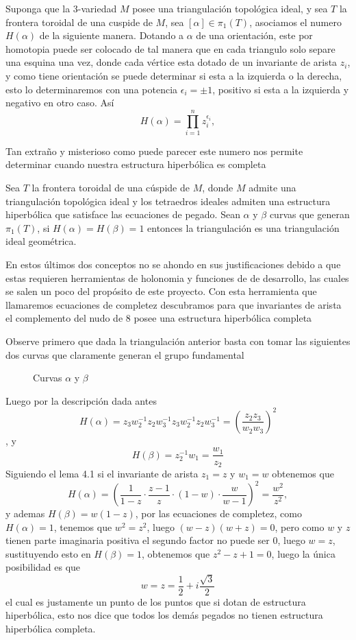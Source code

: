 \begin{definition}
    Suponga que la 3-variedad $M$ posee una triangulación topológica ideal, y sea $T$ la frontera toroidal de una cuspide de $M$, sea $[\alpha]\in\pi_1(T)$, asociamos el numero $H(\alpha)$ de la siguiente manera. Dotando a $\alpha$ de una orientación, este por homotopia puede ser colocado de tal manera que en cada triangulo solo separe una esquina una vez, donde cada vértice esta dotado de un invariante de arista $z_i$, y como tiene orientación se puede determinar si esta a la izquierda o la derecha, esto lo determinaremos con una potencia $\epsilon_i=\pm 1$, positivo si esta a la izquierda y negativo en otro caso. Así 
    $$H(\alpha)=\prod_{i=1}^n z_i^{\epsilon_i},$$
\end{definition}
Tan extraño y misterioso como puede parecer este numero nos permite determinar cuando nuestra estructura hiperbólica es completa
\begin{theorem}
    Sea $T$ la frontera toroidal de una cúspide de $M$, donde $M$ admite una triangulación topológica ideal y los tetraedros ideales admiten una estructura hiperbólica que satisface las ecuaciones de pegado. Sean $\alpha$ y $\beta$ curvas que generan $\pi_1(T)$, si $H(\alpha)=H(\beta)=1$ entonces la triangulación es una triangulación ideal geométrica.
\end{theorem}

En estos últimos dos conceptos no se ahondo en sus justificaciones debido a que estas requieren herramientas de holonomia y funciones de de desarrollo, las cuales se salen un poco del propósito de este proyecto. Con esta herramienta que llamaremos ecuaciones de completez descubramos para que invariantes de arista el complemento del nudo de 8 posee una estructura hiperbólica completa

\begin{eg}
    Observe primero que dada la triangulación anterior basta con tomar las siguientes dos curvas que claramente generan el grupo fundamental
    \begin{figure}[H]
    \centering
    
        \caption{Curvas $\alpha$ y $\beta$}
    \end{figure}
    Luego por la descripción dada antes $$H(\alpha)=z_3w_2^{-1}z_2w_3^{-1}z_3w_2^{-1}z_2w_3^{-1}=\left(\dfrac{z_2z_3}{w_2w_3}\right)^2$$, y $$H(\beta)=z_2^{-1}w_1=\dfrac{w_1}{z_2}$$
    Siguiendo el lema 4.1 si el invariante de arista $z_1=z$ y $w_1=w$  obtenemos que 
    $$H(\alpha)=\left(\frac{1}{1-z}\cdot\frac{z-1}{z}\cdot(1-w)\cdot\frac{w}{w-1}\right)^2=\frac{w^2}{z^2},$$
    y ademas $H(\beta)=w(1-z)$, por las ecuaciones de completez, como $H(\alpha)=1$, tenemos que $w^2=z^2$, luego $(w-z)(w+z)=0$, pero como $w$ y $z$ tienen parte imaginaria positiva el segundo factor no puede ser 0, luego $w=z$, sustituyendo esto en $H(\beta)=1$, obtenemos que $z^2-z+1=0$, luego la única posibilidad es que
    $$w=z=\frac{1}{2}+i\frac{\sqrt{3}}{2}$$
    el cual es justamente un punto de los puntos que si dotan de estructura hiperbólica, esto nos dice que todos los demás pegados no tienen estructura hiperbólica completa.
\end{eg}

